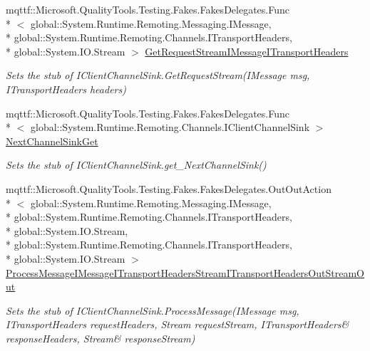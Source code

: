 \begin{DoxyCompactItemize}
mqttf\-::\-Microsoft.\-Quality\-Tools.\-Testing.\-Fakes.\-Fakes\-Delegates.\-Func\\*
$<$ global\-::\-System.\-Runtime.\-Remoting.\-Messaging.\-I\-Message, \\*
global\-::\-System.\-Runtime.\-Remoting.\-Channels.\-I\-Transport\-Headers, \\*
global\-::\-System.\-I\-O.\-Stream $>$ \hyperlink{class_system_1_1_runtime_1_1_remoting_1_1_channels_1_1_fakes_1_1_stub_i_client_channel_sink_a3360fc1881ec5d814a861955162276dd}{Get\-Request\-Stream\-I\-Message\-I\-Transport\-Headers}
\begin{DoxyCompactList}\small\item\em Sets the stub of I\-Client\-Channel\-Sink.\-Get\-Request\-Stream(\-I\-Message msg, I\-Transport\-Headers headers)\end{DoxyCompactList}\item 
mqttf\-::\-Microsoft.\-Quality\-Tools.\-Testing.\-Fakes.\-Fakes\-Delegates.\-Func\\*
$<$ global\-::\-System.\-Runtime.\-Remoting.\-Channels.\-I\-Client\-Channel\-Sink $>$ \hyperlink{class_system_1_1_runtime_1_1_remoting_1_1_channels_1_1_fakes_1_1_stub_i_client_channel_sink_ad646ec92d08ea2c93afee3162f965652}{Next\-Channel\-Sink\-Get}
\begin{DoxyCompactList}\small\item\em Sets the stub of I\-Client\-Channel\-Sink.\-get\-\_\-\-Next\-Channel\-Sink()\end{DoxyCompactList}\item 
mqttf\-::\-Microsoft.\-Quality\-Tools.\-Testing.\-Fakes.\-Fakes\-Delegates.\-Out\-Out\-Action\\*
$<$ global\-::\-System.\-Runtime.\-Remoting.\-Messaging.\-I\-Message, \\*
global\-::\-System.\-Runtime.\-Remoting.\-Channels.\-I\-Transport\-Headers, \\*
global\-::\-System.\-I\-O.\-Stream, \\*
global\-::\-System.\-Runtime.\-Remoting.\-Channels.\-I\-Transport\-Headers, \\*
global\-::\-System.\-I\-O.\-Stream $>$ \hyperlink{class_system_1_1_runtime_1_1_remoting_1_1_channels_1_1_fakes_1_1_stub_i_client_channel_sink_aad3ae4fe32ff5b64a16cc99d7510f80c}{Process\-Message\-I\-Message\-I\-Transport\-Headers\-Stream\-I\-Transport\-Headers\-Out\-Stream\-Out}
\begin{DoxyCompactList}\small\item\em Sets the stub of I\-Client\-Channel\-Sink.\-Process\-Message(I\-Message msg, I\-Transport\-Headers request\-Headers, Stream request\-Stream, I\-Transport\-Headers\& response\-Headers, Stream\& response\-Stream)\end{DoxyCompactList}\item 

\end{DoxyCompactItemize}

